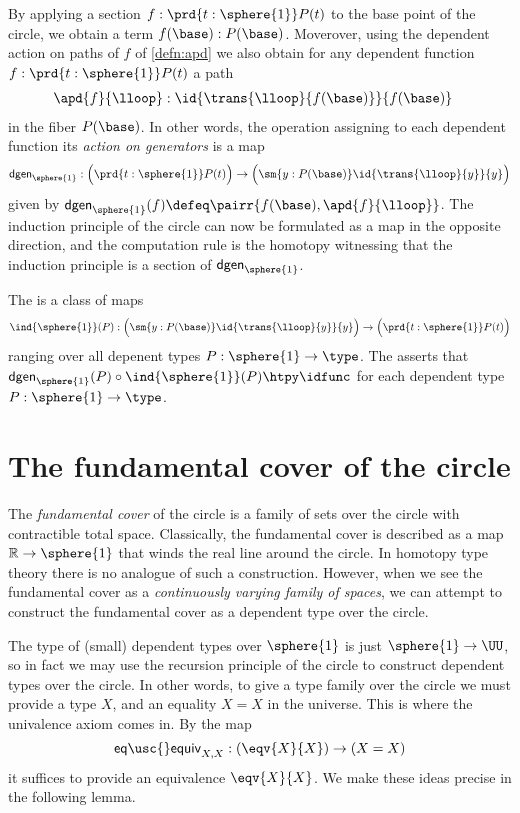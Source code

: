 By applying a section $f:\prd{t:\sphere{1}}P(t)$ to the base point of the circle, we obtain a term $f(\base):P(\base)$. Moverover, using the dependent action on paths of $f$ of \autoref{defn:apd} we also obtain for any dependent function $f:\prd{t:\sphere{1}}P(t)$ a path
\begin{align*}
\apd{f}{\lloop} & : \id{\trans{\lloop}{f(\base)}}{f(\base)}
\end{align*}
in the fiber $P(\base)$.
In other words, the operation assigning to each dependent function its \emph{action on generators} is a map
\begin{equation}\label{eq:kappa_circle}
\mathsf{dgen}_{\sphere{1}}:\Big(\prd{t:\sphere{1}}P(t)\Big)\to\Big(\sm{y:P(\base)}\id{\trans{\lloop}{y}}{y}\Big)
\end{equation}
given by $\mathsf{dgen}_{\sphere{1}}(f)\defeq\pairr{f(\base),\apd{f}{\lloop}}$.
The induction principle of the circle can now be formulated as a map in the opposite direction, and the computation rule is the homotopy witnessing that the induction principle is a section of $\mathsf{dgen}_{\sphere{1}}$.

\begin{defn}
The  is a class of maps
\begin{equation*}
\ind{\sphere{1}}(P):\Big(\sm{y:P(\base)}\id{\trans{\lloop}{y}}{y}\Big)\to\Big(\prd{t:\sphere{1}} P(t)\Big)
\end{equation*}
ranging over all depenent types $P:\sphere{1}\to\type$. 
The  asserts that $\mathsf{dgen}_{\sphere{1}}(P) \circ\ind{\sphere{1}}(P) \htpy \idfunc$ for each dependent type $P:\sphere{1}\to\type$. 
\end{defn} 

\section{The fundamental cover of the circle}

The \emph{fundamental cover} of the circle is a family of sets over the circle with contractible total space.
Classically, the fundamental cover is described as a map $\mathbb{R}\to\sphere{1}$ that winds the real line around the circle.
In homotopy type theory there is no analogue of such a construction.
However, when we see the fundamental cover as a \emph{continuously varying family of spaces}, we can attempt to construct the fundamental cover as a dependent type over the circle. 

The type of (small) dependent types over $\sphere{1}$ is just $\sphere{1}\to\UU$, so in fact we may use the recursion principle of the circle to construct dependent types over the circle. 
In other words, to give a type family over the circle we must provide a type $X$, and an equality $X=X$ in the universe.
This is where the univalence axiom comes in. By the map
\begin{equation*}
\mathsf{eq\usc{}equiv}_{X,X}:(\eqv{X}{X})\to (X=X)
\end{equation*}
it suffices to provide an equivalence $\eqv{X}{X}$. We make these ideas precise in the following lemma.

